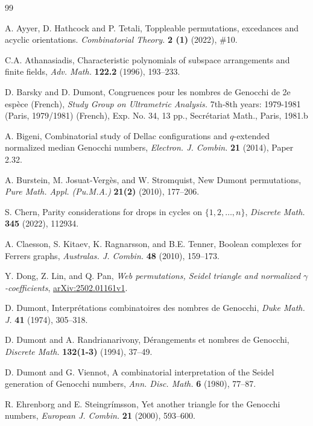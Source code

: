 \documentclass[11pt,reqno]{amsart}
\numberwithin{equation}{section}
\theoremstyle{plain}
\theoremstyle{definition}
\begin{document}
\begin{thebibliography}{99}
    
     A. Ayyer, D. Hathcock and P. Tetali, Toppleable permutations, excedances and acyclic orientations. {\em Combinatorial Theory.} {\bf2 (1)} (2022), \#10.

     C.A. Athanasiadis, Characteristic polynomials of subspace arrangements and finite fields, {\em Adv. Math.} {\bf122.2} (1996), 193--233.

     D. Barsky and D. Dumont, Congruences pour les nombres de Genocchi de 2e esp\`ece (French), {\em Study Group on Ultrametric Analysis.} 7th-8th years: 1979-1981 (Paris, 1979/1981) (French), Exp. No. 34, 13 pp., Secr\'etariat Math., Paris, 1981.b

     A. Bigeni, Combinatorial study of Dellac configurations and $q$-extended normalized median Genocchi numbers, {\em Electron. J. Combin.} {\bf21} (2014), Paper 2.32.

     A. Burstein, M. Josuat-Verg\`es, and W. Stromquist, New Dumont permutations, {\em Pure Math. Appl. (Pu.M.A.)} {\bf21(2)} (2010), 177--206. 

     S. Chern, Parity considerations for drops in cycles on $\{1,2,\ldots,n\}$, {\em Discrete Math.} {\bf345} (2022), 112934.
    
    

     A. Claesson, S. Kitaev, K. Ragnarsson, and B.E. Tenner, Boolean complexes for Ferrers graphs, {\em Australas. J. Combin.} {\bf48} (2010), 159--173.

     Y. Dong, Z. Lin, and Q. Pan, {\it Web permutations, Seidel triangle and normalized $\gamma$-coefficients}, \href{https://arxiv.org/abs/2502.01161v1}{arXiv:2502.01161v1}.

     D. Dumont, Interpr\'etations combinatoires des nombres de Genocchi, {\em Duke Math. J.} {\bf41} (1974), 305--318.

     D. Dumont and A. Randrianarivony, D\'erangements et nombres de Genocchi, {\em Discrete Math.} {\bf132(1-3)} (1994), 37--49.

     D. Dumont and G. Viennot, A combinatorial interpretation of the Seidel generation of Genocchi numbers, {\em Ann. Disc. Math.} {\bf6} (1980), 77--87.

     R. Ehrenborg and E. Steingr\'imsson, Yet another triangle for the Genocchi numbers, {\em European J. Combin.} {\bf21} (2000), 593--600.
    

\end{thebibliography}
\end{document}
